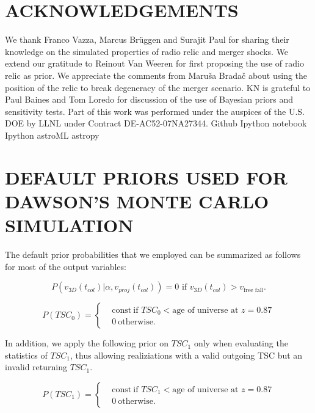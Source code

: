 \section{ACKNOWLEDGEMENTS}
We thank Franco Vazza, Marcus Br\"{u}ggen and Surajit Paul for sharing
their knowledge on the simulated properties of radio relic and merger
shocks. We
extend our gratitude to Reinout Van Weeren for first proposing the use of
radio relic as prior. We appreciate the comments from Maru\v{s}a
Brada\v{c} about using the position of the relic to break degeneracy
of the merger scenario. KN is grateful to Paul Baines and Tom Loredo for
discussion of the use of Bayesian priors and sensitivity tests. 
Part of this work was performed under the auspices of the U.S. DOE by LLNL under Contract DE-AC52-07NA27344.
Github 
Ipython notebook 
Ipython 
astroML 
astropy
%
%



\appendix

\section{DEFAULT PRIORS USED FOR DAWSON'S MONTE CARLO SIMULATION}
\label{app:priors}
%
The default prior probabilities that we employed can be summarized as
follows for most of the output variables: 

\begin{equation}
	P(v_{3D}(t_{col}) | \alpha, v_{proj}(t_{col})) = 0\text{ if }v_{3D}(t_{col}) >
	v_{\text{free fall}}. 
\end{equation}


\begin{equation}
	P(TSC_0) = 
	\begin{cases}
		& \text{const}~\text{if }TSC_0 < \text{age of universe at } z=0.87	\\
		& 0~\text{otherwise}.
	\end{cases}
\end{equation}

In addition, we apply the following prior on $TSC_1$ only when evaluating the
statistics of $TSC_1$, thus allowing realiziations with a valid
outgoing TSC but an invalid returning $TSC_1$. 

\begin{equation}
	P(TSC_1) = 
	\begin{cases}
		& \text{const}~\text{if }TSC_1 < \text{age of universe at } z=0.87	\\
		& 0~\text{otherwise} \label{eqn:TSM_1}.
	\end{cases}
\end{equation}

